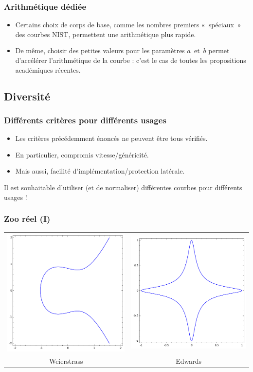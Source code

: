 \documentclass[francais]{beamer}
\begin{document}
\begin{frame}\frametitle{Arithmétique dédiée}
\begin{itemize}
\item Certains choix de corps de base,
comme les nombres premiers « spéciaux » des courbes NIST,
permettent une arithmétique plus rapide.
\bigskip
\item De même, choisir des petites valeurs pour les paramètres $a$ et $b$
permet d'accélérer l'arithmétique de la courbe :
c'est le cas de toutes les propositions académiques récentes.
\end{itemize}
\end{frame}

\subsection{Diversité}
\begin{frame}\frametitle{Différents critères pour différents usages}
\begin{itemize}
\item Les critères précédemment énoncés ne peuvent être tous vérifiés.
\item En particulier, compromis vitesse/généricité.
\item Mais aussi, facilité d'implémentation/protection latérale.
\end{itemize}
\begin{block}{}
Il est souhaitable d'utiliser (et de normaliser) différentes courbes
pour différents usages !
\end{block}
\end{frame}

\begin{frame}\frametitle{Zoo réel (I)}
\begin{center}
\begin{tabular}{cc}
\includegraphics[width=.4\hsize]{weierstrass} & \includegraphics[width=.4\hsize]{edwards} \\
Weierstrass & Edwards \\
\end{tabular}
\end{center}
\end{frame}
\end{document}
